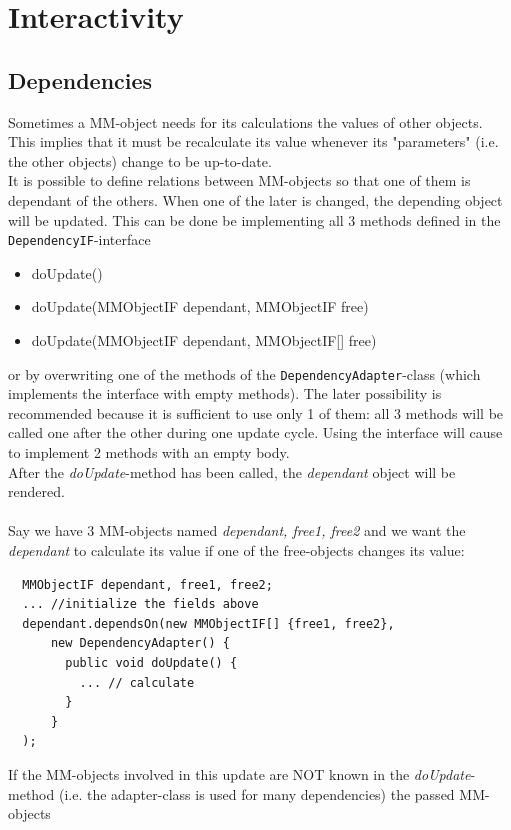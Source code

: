 \documentclass[a4paper,12pt]{book}
\begin{document}
\chapter{Interactivity}
  \section{Dependencies}
  Sometimes a MM-object needs for its calculations the values of other objects.
  This implies that it must be recalculate its value whenever its "parameters"
  (i.e. the other objects) change to be up-to-date.\\
  It is possible to define relations between MM-objects so that one of them is dependant
  of the others. When one of the later is changed, the depending object will be
  updated. This can be done be implementing all 3 methods defined in the 
  \verb|DependencyIF|-interface
  {\small\ttfamily
  \begin{itemize}
    \item doUpdate()
    \item doUpdate(MMObjectIF dependant, MMObjectIF free)
    \item doUpdate(MMObjectIF dependant, MMObjectIF[] free)
  \end{itemize}
  }
  or by overwriting one of the methods of the
  \verb|DependencyAdapter|-class (which implements the interface with empty methods).
  The later possibility is recommended because it is sufficient to use only 1 of them: 
  all 3 methods will be called one after the other during one update cycle.
  Using the interface will cause to implement 2 methods with an empty body.\\
  After the \textit{doUpdate}-method has been called, the \textit{dependant} object
  will be rendered.
  \\\\
  Say we have 3 MM-objects named \textit{dependant, free1, free2} and we want the
  \textit{dependant} to calculate its value if one of the free-objects changes its
  value:\\
  {\small\ttfamily
  \begin{verbatim}
  MMObjectIF dependant, free1, free2;
  ... //initialize the fields above
  dependant.dependsOn(new MMObjectIF[] {free1, free2},
      new DependencyAdapter() {
        public void doUpdate() {
          ... // calculate
        }
      }
  );
  \end{verbatim}
  }
  If the MM-objects involved in this update are NOT known in the \textit{doUpdate}-method
  (i.e. the adapter-class is used for many dependencies) the passed MM-objects
\end{document}
